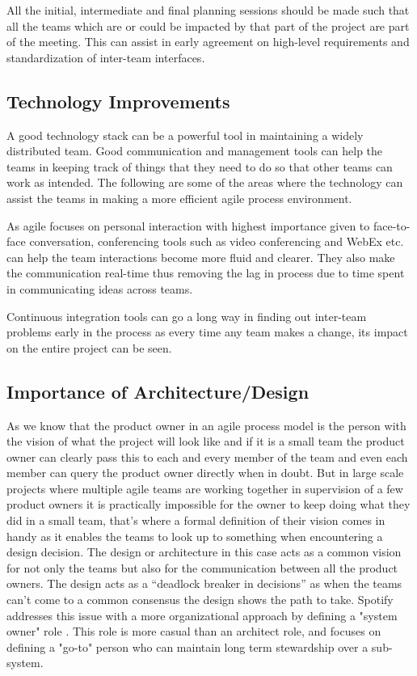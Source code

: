 All the initial, intermediate and final planning sessions should be made such that all the teams which are or could be impacted by that part of the project are part of the meeting.
This can assist in early agreement on high-level requirements and standardization of inter-team interfaces.

\subsection{Technology Improvements} 
\label{sec:tech_impv}
	A good technology stack can be a powerful tool in maintaining a widely distributed team.
	Good communication and management tools can help the teams in keeping track of things that they need to do so that other teams can work as intended.
	The following are some of the areas where the technology can assist the teams in making a more efficient agile process environment.

As agile focuses on personal interaction with highest importance given to face-to-face conversation, conferencing tools such as video conferencing and WebEx etc. can help the team interactions become more fluid and clearer.
They also make the communication real-time thus removing the lag in process due to time spent in communicating ideas across teams.

Continuous integration tools can go a long way in finding out inter-team problems early in the process as every time any team makes a change, its impact on the entire project can be seen.

\subsection{Importance of Architecture/Design}\label{sec:imp_of_dsgn}

As we know that the product owner in an agile process model is the person with the vision of what the project will look like and if it is a small team the product owner can clearly pass this to each and every member of the team and even each member can query the product owner directly when in doubt.
But in large scale projects where multiple agile teams are working together in supervision of a few product owners it is practically impossible for the owner to keep doing what they did in a small team, that’s where a formal definition of their vision comes in handy as it enables the teams to look up to something when encountering a design decision.
The design or architecture in this case acts as a common vision for not only the teams but also for the communication between all the product owners.
The design acts as a “deadlock breaker in decisions” \cite{architecureRole_article} as when the teams can’t come to a common consensus the design shows the path to take.
Spotify addresses this issue with a more organizational approach by defining a "system owner" role \cite{kniberg12}.
This role is more casual than an architect role, and focuses on defining a "go-to" person who can maintain long term stewardship over a sub-system. 

